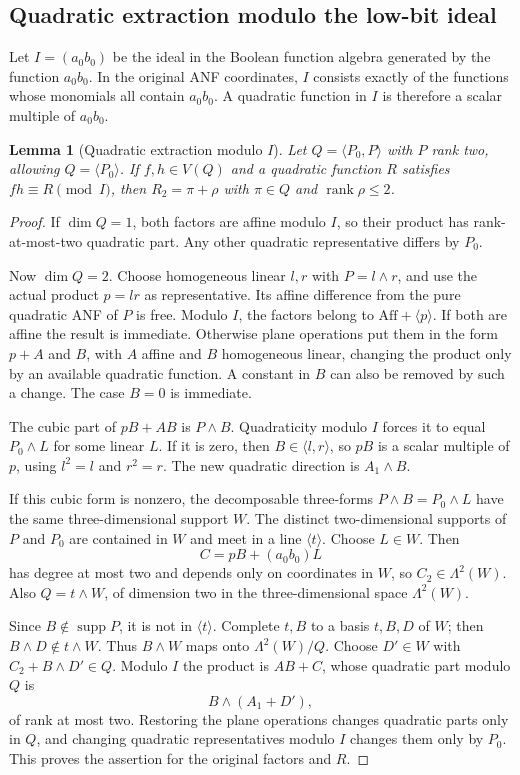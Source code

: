 \documentclass[11pt,a4paper]{article}
\theoremstyle{plain}
\newtheorem{lemma}[theorem]{Lemma}
\theoremstyle{remark}
\newcommand{\Aff}{\mathrm{Aff}}
\newcommand{\supp}{\operatorname{supp}}
\newcommand{\rk}{\operatorname{rank}}
\begin{document}
\subsection{Quadratic extraction modulo the low-bit ideal}
Let $I=(a_0b_0)$ be the ideal in the Boolean function algebra generated by the function $a_0b_0$. In the original ANF coordinates, $I$ consists exactly of the functions whose monomials all contain $a_0b_0$. A quadratic function in $I$ is therefore a scalar multiple of $a_0b_0$.

\begin{lemma}[Quadratic extraction modulo $I$]\label{l2:lem:ideal}
Let $Q=\langle P_0,P\rangle$ with $P$ rank two, allowing $Q=\langle P_0\rangle$. If $f,h\in V(Q)$ and a quadratic function $R$ satisfies $fh\equiv R\pmod I$, then $R_2=\pi+\rho$ with $\pi\in Q$ and $\rk\rho\le2$.
\end{lemma}
\begin{proof}
If $\dim Q=1$, both factors are affine modulo $I$, so their product has rank-at-most-two quadratic part. Any other quadratic representative differs by $P_0$.

Now $\dim Q=2$. Choose homogeneous linear $l,r$ with $P=l\wedge r$, and use the actual product $p=lr$ as representative. Its affine difference from the pure quadratic ANF of $P$ is free. Modulo $I$, the factors belong to $\Aff+\langle p\rangle$. If both are affine the result is immediate. Otherwise plane operations put them in the form $p+A$ and $B$, with $A$ affine and $B$ homogeneous linear, changing the product only by an available quadratic function. A constant in $B$ can also be removed by such a change. The case $B=0$ is immediate.

The cubic part of $pB+AB$ is $P\wedge B$. Quadraticity modulo $I$ forces it to equal $P_0\wedge L$ for some linear $L$. If it is zero, then $B\in\langle l,r\rangle$, so $pB$ is a scalar multiple of $p$, using $l^2=l$ and $r^2=r$. The new quadratic direction is $A_1\wedge B$.

If this cubic form is nonzero, the decomposable three-forms $P\wedge B=P_0\wedge L$ have the same three-dimensional support $W$. The distinct two-dimensional supports of $P$ and $P_0$ are contained in $W$ and meet in a line $\langle t\rangle$. Choose $L\in W$. Then
\[
C=pB+(a_0b_0)L
\]
has degree at most two and depends only on coordinates in $W$, so $C_2\in\Lambda^2(W)$. Also $Q=t\wedge W$, of dimension two in the three-dimensional space $\Lambda^2(W)$.

Since $B\notin\supp P$, it is not in $\langle t\rangle$. Complete $t,B$ to a basis $t,B,D$ of $W$; then $B\wedge D\notin t\wedge W$. Thus $B\wedge W$ maps onto $\Lambda^2(W)/Q$. Choose $D'\in W$ with $C_2+B\wedge D'\in Q$. Modulo $I$ the product is $AB+C$, whose quadratic part modulo $Q$ is
\[
B\wedge(A_1+D'),
\]
of rank at most two. Restoring the plane operations changes quadratic parts only in $Q$, and changing quadratic representatives modulo $I$ changes them only by $P_0$. This proves the assertion for the original factors and $R$.
\end{proof}
\end{document}
